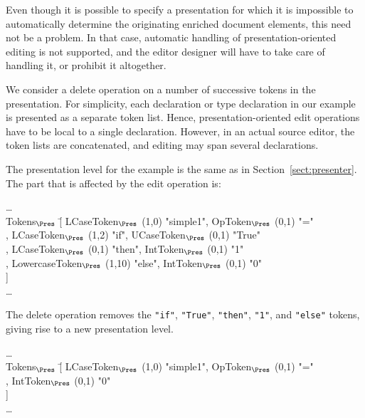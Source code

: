 \bc
Even though it is possible to specify a presentation for which it is impossible to automatically determine the originating enriched document elements, this need not be a problem. In that case, automatic handling of presentation-oriented editing is not supported, and the editor designer will have to take care of handling it, or prohibit it altogether. \ec

We consider a delete operation on a number of successive tokens in the presentation. For simplicity, each declaration or type declaration in our example is presented as a separate token list. Hence, presentation-oriented edit operations have to be local to a single declaration. However, in an actual source editor, the token lists are concatenated, and editing may span several declarations.

The presentation level for the example is the same as in Section~\ref{sect:presenter}. The part that is affected by the edit operation is: 

\small \ttfamily
\begin{tabbing}
\dots\\
Tokens$_{\Pres}$ \= [ LCaseToken$_{\Pres}$ (1,0) "simple1", OpToken$_{\Pres}$ (0,1) "="\\
                         \> , LCaseToken$_{\Pres}$ (1,2) "if", UCaseToken$_{\Pres}$ (0,1) "True"\\
                         \> , LCaseToken$_{\Pres}$ (0,1) "then", IntToken$_{\Pres}$ (0,1) "1"\\
                         \> , LowercaseToken$_{\Pres}$ (1,10) "else", IntToken$_{\Pres}$ (0,1) "0"\\
                         \> ]\\
\dots                                                  
\end{tabbing}
\rmfamily \normalsize

The delete operation removes the \verb|"if"|,  \verb|"True"|,  \verb|"then"|,  \verb|"1"|, and  \verb|"else"| tokens, giving rise to a new presentation level.

\small \ttfamily
\begin{tabbing}
\dots\\
Tokens$_{\Pres}$ \= [ LCaseToken$_{\Pres}$ (1,0) "simple1", OpToken$_{\Pres}$ (0,1) "="\\
                         \> ,  IntToken$_{\Pres}$ (0,1) "0"\\
                         \> ]\\
\dots                                                  
\end{tabbing}
\rmfamily \normalsize

